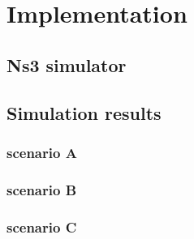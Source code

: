 \chapter{Implementation}

\section{Ns3 simulator}

\section{Simulation results}

\subsection{scenario A}

\subsection{scenario B}

\subsection{scenario C}